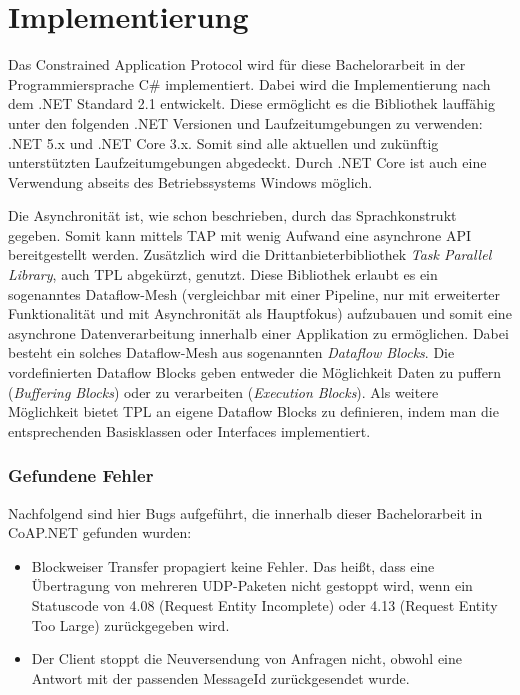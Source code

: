 \section{Implementierung}
\label{sec:implementierung}

Das Constrained Application Protocol wird für diese Bachelorarbeit in der Programmiersprache C\# implementiert. Dabei wird die Implementierung nach dem .NET Standard 2.1 entwickelt. Diese ermöglicht es die Bibliothek lauffähig unter den folgenden .NET Versionen und Laufzeitumgebungen zu verwenden: .NET 5.x und .NET Core 3.x. Somit sind alle aktuellen und zukünftig unterstützten Laufzeitumgebungen abgedeckt. Durch .NET Core ist auch eine Verwendung abseits des Betriebssystems Windows möglich.

Die Asynchronität ist, wie schon beschrieben, durch das Sprachkonstrukt gegeben. Somit kann mittels TAP mit wenig Aufwand eine asynchrone API bereitgestellt werden. Zusätzlich wird die Drittanbieterbibliothek \textit{Task Parallel Library}, auch TPL abgekürzt, genutzt. Diese Bibliothek erlaubt es ein sogenanntes Dataflow-Mesh (vergleichbar mit einer Pipeline, nur mit erweiterter Funktionalität und mit Asynchronität als Hauptfokus) aufzubauen und somit eine asynchrone Datenverarbeitung innerhalb einer Applikation zu ermöglichen. Dabei besteht ein solches Dataflow-Mesh aus sogenannten \textit{Dataflow Blocks}. Die vordefinierten Dataflow Blocks geben entweder die Möglichkeit Daten zu puffern (\textit{Buffering Blocks}) oder zu verarbeiten (\textit{Execution Blocks}). Als weitere Möglichkeit bietet TPL an eigene Dataflow Blocks zu definieren, indem man die entsprechenden Basisklassen oder Interfaces implementiert.

\subsubsection{Gefundene Fehler}
\label{subsubsec:gefundende-fehler}

Nachfolgend sind hier Bugs aufgeführt, die innerhalb dieser Bachelorarbeit in CoAP.NET gefunden wurden:
\begin{itemize}
    \item Blockweiser Transfer propagiert keine Fehler. Das heißt, dass eine Übertragung von mehreren UDP-Paketen nicht gestoppt wird, wenn ein Statuscode von 4.08 (Request Entity Incomplete) oder 4.13 (Request Entity Too Large) zurückgegeben wird.
    \item Der Client stoppt die Neuversendung von Anfragen nicht, obwohl eine Antwort mit der passenden MessageId zurückgesendet wurde.
\end{itemize}

